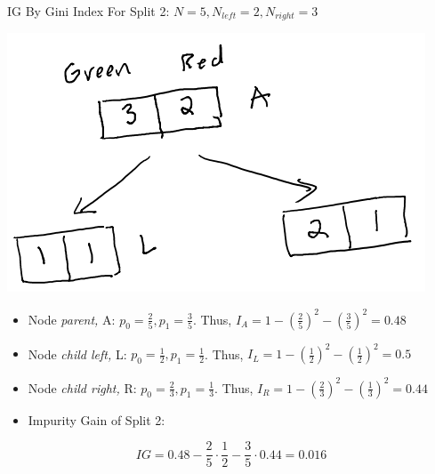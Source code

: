 \documentclass[
  ignorenonframetext,
]{beamer}
\begin{document}
\begin{frame}{IG By Gini Index}
\label{ig-by-gini-index-1}
For Split 2: \(N = 5, N_{left} =2, N_{right} = 3\)

\includegraphics{images/im3.png}

\begin{itemize}
\item
  Node \emph{parent,} A: \(p_0 = \frac{2}{5}, p_1 = \frac{3}{5}\). Thus,
  \(I_{A} = 1-(\frac{2}{5})^2- (\frac{3}{5})^2 = 0.48\)
\item
  Node \emph{child left,} L: \(p_0 = \frac{1}{2}, p_1 = \frac{1}{2}\).
  Thus, \(I_{L} = 1- (\frac{1}{2})^2-(\frac{1}{2})^2=0.5\)
\item
  Node \emph{child right,} R: \(p_0 = \frac{2}{3}, p_1 = \frac{1}{3}\).
  Thus, \(I_{R} = 1-(\frac{2}{3})^2 -(\frac{1}{3})^2 = 0.44\)
\item
  Impurity Gain of Split 2:
\end{itemize}

\[IG = 0.48 - \frac{2}{5} \cdot \frac{1}{2}-\frac{3}{5} \cdot 0.44 = 0.016\]
\end{frame}
\end{document}
